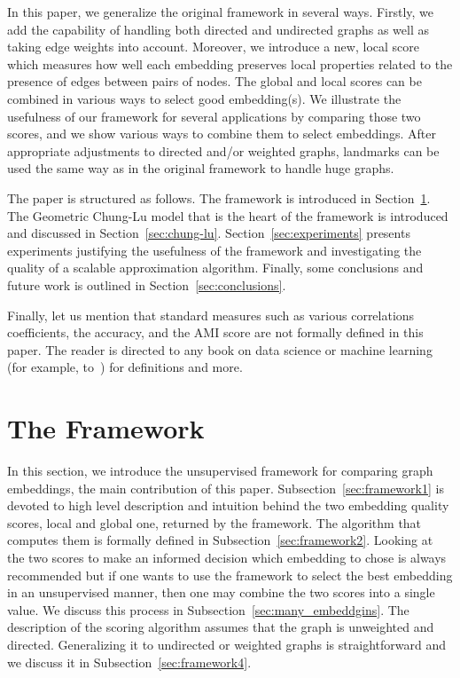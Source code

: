 \documentclass[11pt]{article}
\begin{document}
In this paper, we generalize the original framework in several ways. Firstly, we add the capability of handling both directed and undirected graphs as well as taking edge weights into account. Moreover, we introduce a new, local score which measures how well each embedding preserves local properties related to the presence of edges between pairs of nodes. The global and local scores can be combined in various ways to select good embedding(s). We illustrate the usefulness of our framework for several applications by comparing those two scores, and we show various ways to combine them to select embeddings.
After appropriate adjustments to directed and/or weighted graphs, landmarks can be used the same way as in the original framework to handle huge graphs.

\medskip

The paper is structured as follows. The framework is introduced in Section~\ref{sec:framework}. The Geometric Chung-Lu model that is the heart of the framework is introduced and discussed in Section~\ref{sec:chung-lu}. Section~\ref{sec:experiments} presents experiments justifying the usefulness of the framework and investigating the quality of a scalable approximation algorithm. Finally, some conclusions and future work is outlined in Section~\ref{sec:conclusions}.

Finally, let us mention that standard measures such as various correlations coefficients, the accuracy, and the AMI score are not formally defined in this paper. The reader is directed to any book on data science or machine learning (for example, to~\cite{book}) for definitions and more.


\section{The Framework}\label{sec:framework}

In this section, we introduce the unsupervised framework for comparing graph embeddings, the main contribution of this paper. Subsection~\ref{sec:framework1} is devoted to high level description and intuition behind the two embedding quality scores, local and global one, returned by the framework. The algorithm that computes them is formally defined in Subsection~\ref{sec:framework2}. Looking at the two scores to make an informed decision which embedding to chose is always recommended but if one wants to use the framework to select the best embedding in an unsupervised manner, then one may combine the two scores into a single value. We discuss this process in Subsection~\ref{sec:many_embeddgins}. The description of the scoring algorithm assumes that the graph is unweighted and directed. Generalizing it to undirected or weighted graphs is straightforward and we discuss it in Subsection~\ref{sec:framework4}.
\end{document}

